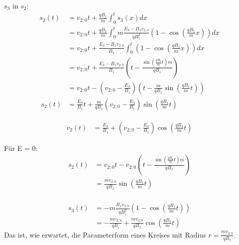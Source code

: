 \documentclass[a4paper, 10pt]{article}
\begin{document}
$s_3$ in $s_2$:
\begin{equation}
\begin{split}
s_2(t)  &= v_{2;0} t + \frac{q B_1}{m} \int_0^t s_3(x) dx	\\\
		&= v_{2;0} t + \frac{q B_1}{m} \int_0^t m \frac{E_3 - B_1 v_{2;0}}{q B_1^2} \left( 1 - \cos\left(\frac{q B_1}{m} x\right)\right) dx	\\\
		&= v_{2;0} t + \frac{E_3 - B_1 v_{2;0}}{B_1} \int_0^t \left( 1 - \cos\left(\frac{q B_1}{m} x\right)\right) dx	\\\
		&= v_{2;0} t + \frac{E_3 - B_1 v_{2;0}}{B_1} \left(t - \frac{\sin\left(\frac{q B_1}{m} t\right) m}{q B_1}\right) \\\
%
		&= v_{2;0} t - \left(v_{2;0} - \frac{E_3}{B_1}\right) \left(t - \frac{m}{q B_1} \sin\left(\frac{q B_1}{m} t\right) \right) \\\
%
s_2(t)	&= \frac{E_3}{B_1} t + \frac{m}{q B_1} \left(v_{2;0} - \frac{E_3}{B_1}\right) \sin\left(\frac{q B_1}{m} t\right)
\end{split}
\end{equation}

\begin{equation}
\begin{split}
v_2(t) &= \frac{E_3}{B_1} + \left(v_{2;0} - \frac{E_3}{B_1}\right) \cos\left(\frac{q B_1}{m} t\right)
\end{split}
\end{equation}

Für E = 0:
\begin{equation}
\begin{split}
s_2(t) 	&= v_{2;0} t - v_{2;0} \left(t - \frac{\sin\left(\frac{q B_1}{m} t\right) m}{q B_1}\right) \\\
		&= \frac{m v_{2;0}}{q B_1} \sin\left(\frac{q B_1}{m} t\right) \\\
\end{split}
\end{equation}

\begin{equation}
\begin{split}
s_3(t) 	&= -m \frac{B_1 v_{2;0}}{q B_1^2} \left( 1 - \cos\left(\frac{q B_1}{m} t\right)\right) \\\
		&= -\frac{m v_{2;0}}{q B_1} + \frac{m v_{2;0}}{q B_1} \cos\left(\frac{q B_1}{m} t\right)
\end{split}
\end{equation}
Das ist, wie erwartet, die Parameterform eines Kreises mit Radius $r = \frac{m v_{2;0}}{q B_1}$.
\end{document}
